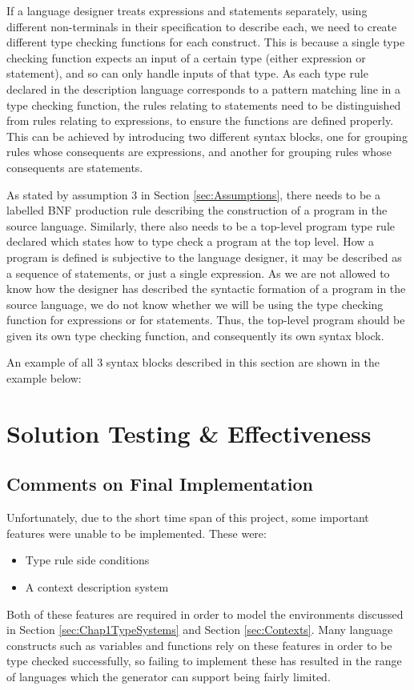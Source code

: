 \documentclass{UoYCSproject}
\begin{document}
If a language designer treats expressions and statements separately, using 
different non-terminals in their specification to describe each, we need to
create different type checking functions for each construct. This is because
a single type checking function expects an input of a certain type (either 
expression or statement), and so can only handle inputs of that type. As each
type rule declared in the description language corresponds to a pattern matching
line in a type checking function, the rules relating to statements need to be
distinguished from rules relating to expressions, to ensure the functions are
defined properly. This can be achieved by introducing two different syntax blocks,
one for grouping rules whose consequents are expressions, and another for
grouping rules whose consequents are statements. 

As stated by assumption 3 in Section \ref{sec:Assumptions}, there needs to be
a labelled BNF production rule describing the construction of a program in the
source language. Similarly, there also needs to be a top-level program type rule
declared which states how to type check a program at the top level. How
a program is defined is subjective to the language designer, it may be described
as a sequence of statements, or just a single expression. As we are not allowed
to know how the designer has described the syntactic formation of a program in
the source language, we do not know whether we will be using the type checking
function for expressions or for statements. Thus, the top-level program should
be given its own type checking function, and consequently its own syntax block.

An example of all 3 syntax blocks described in this section are shown in the
example below:


\chapter{Solution Testing \& Effectiveness}

\section{Comments on Final Implementation}
Unfortunately, due to the short time span of this project, some 
important features were unable to be implemented. These were:
\begin{itemize}
    \item Type rule side conditions
    \item A context description system
\end{itemize}
Both of these features are required in order to model the environments discussed
in Section \ref{sec:Chap1TypeSystems} and Section \ref{sec:Contexts}. 
Many language constructs such as variables and functions rely on these features 
in order to be type checked successfully, so failing to implement these has 
resulted in the range of languages which the generator can support being fairly 
limited.
\end{document}

